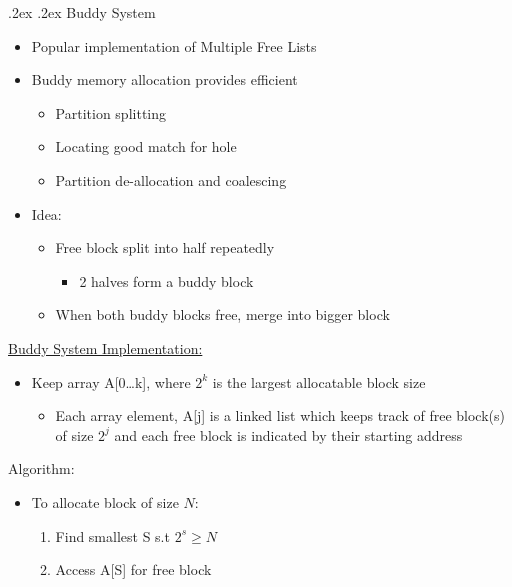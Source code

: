 \documentclass[13pt,landscape,a4paper]{article}
\makeatletter
\renewcommand{\subsubsection}{\@startsection{subsubsection}{1}{0mm}%
    {.2ex}%
    {.2ex}%
    {\rmfamily\bfseries}}
\makeatother
\begin{document}
\begin{multicols*}{3}
        \subsubsection{Buddy System}
        \begin{itemize}
            \item Popular implementation of Multiple Free Lists
            \item Buddy memory allocation provides efficient
            \begin{itemize}
                \item Partition splitting
                \item Locating good match for hole
                \item Partition de-allocation and coalescing
            \end{itemize}
            \item Idea:
            \begin{itemize}
                \item Free block split into half repeatedly
                \begin{itemize}
                    \item 2 halves form a buddy block
                \end{itemize}
                \item When both buddy blocks free, merge into bigger block
            \end{itemize}
        \end{itemize}
        \underline{Buddy System Implementation:}
        \begin{itemize}
            \item Keep array A[0…k], where $2^k$ is the largest allocatable block size
            \begin{itemize}
                \item Each array element, A[j] is a linked list which keeps track of free block(s) of size $2^j$ and each free block is indicated by their starting address
            \end{itemize}
        \end{itemize}
       	Algorithm:
        \begin{itemize}
            \item To allocate block of size $N$:
            \begin{enumerate}
                \item Find smallest S s.t $2^s\geq N$
                \item Access A[S] for free block

\end{enumerate}
\end{itemize}
\end{multicols*}
\end{document}
